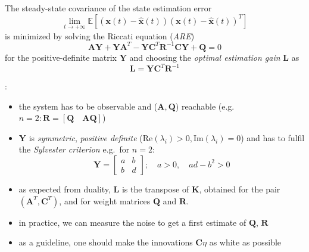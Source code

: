 The steady-state covariance of the state estimation error
\begin{equation*}
    \lim_{t\to+\infty}\mathbb{E}\left[(\mathbf{x}(t)-\hat{\mathbf{x}}(t)){(\mathbf{x}(t)-\hat{\mathbf{x}}(t))}^T\right]
\end{equation*}
is minimized by solving the Riccati equation (\textit{ARE})
\begin{equation*}
    \mathbf{AY}+\mathbf{YA}^T-\mathbf{YC}^T \mathbf{R}^{-1}\mathbf{CY}+\mathbf{Q}=0
\end{equation*}
for the positive-definite matrix $\mathbf{Y}$ and choosing the \textit{optimal estimation gain} $\mathbf{L}$ as
\begin{equation*}
    \mathbf{L}=\mathbf{YC}^T \mathbf{R}^{-1}
\end{equation*}

:

\begin{itemize}
    \item the system has to be observable and ($\mathbf{A,Q}$) reachable\newline
          (e.g. $n=2: \mathbf{R}= \left[\mathbf{Q}\quad \mathbf{AQ}\right]$)
    \item $\mathbf{Y}$ is \textit{symmetric}, \textit{positive definite} ($\mathrm{Re}(\lambda_i) > 0, \mathrm{Im}(\lambda_i) = 0$) and has to fulfil the \textit{Sylvester criterion} e.g.\ for $n=2$:
          \noindent\begin{equation*}
              \mathbf{Y}=\begin{bmatrix}
                  a & b \\
                  b & d
              \end{bmatrix}; \quad a>0, \quad ad-b^2>0
          \end{equation*}
    \item as expected from duality, $\mathbf{L}$ is the transpose of $\mathbf{K}$, obtained for the pair $(\mathbf{A}^T, \mathbf{C}^T)$, and for weight matrices $\mathbf{Q}$ and $\mathbf{R}$.
    \item in practice, we can measure the noise to get a first estimate of $\mathbf{Q}$, $\mathbf{R}$
    \item as a guideline, one should make the innovations $\mathbf{C}\eta$ as white as possible
\end{itemize}
